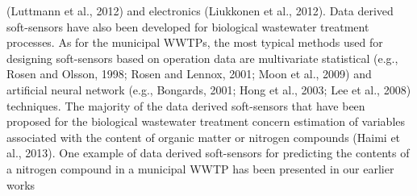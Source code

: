 (Luttmann et al., 2012) and electronics (Liukkonen et al., 2012). Data derived soft-sensors have also been developed for biological wastewater treatment processes. As for the municipal WWTPs, the most typical methods used for designing soft-sensors based on operation data are multivariate statistical (e.g., Rosen and Olsson, 1998; Rosen and Lennox, 2001; Moon et al., 2009) and artificial neural network (e.g., Bongards, 2001; Hong et al., 2003; Lee et al., 2008) techniques. The majority of the data derived soft-sensors that have been proposed for the biological wastewater treatment concern estimation of variables associated with the content of organic matter or nitrogen compounds (Haimi et al., 2013). One example of data derived soft-sensors for predicting the contents of a nitrogen compound in a municipal WWTP has been presented in our earlier works






